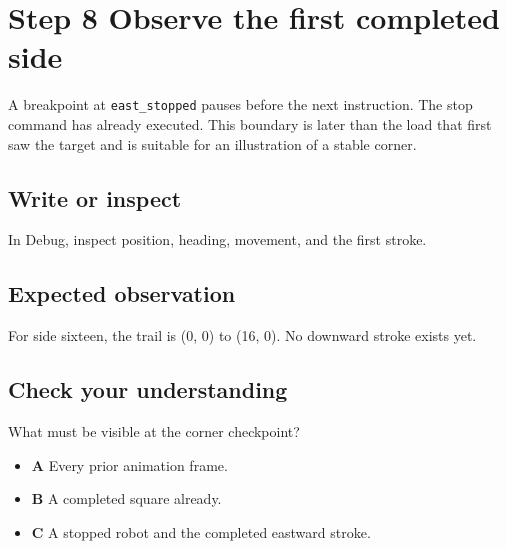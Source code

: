 \section{Step 8 Observe the first completed
  side}\label{006-marsbot-square-s08-step-8-observe-the-first-completed-side}

A breakpoint at \texttt{east\_stopped} pauses before the next
instruction. The stop command has already executed. This boundary is
later than the load that first saw the target and is suitable for an
illustration of a stable corner.

\subsection{Write or
  inspect}\label{006-marsbot-square-s08-write-or-inspect}

In Debug, inspect position, heading, movement, and the first stroke.

\subsection{Expected
  observation}\label{006-marsbot-square-s08-expected-observation}

For side sixteen, the trail is (0, 0) to (16, 0). No downward stroke
exists yet.

\subsection{Check your
  understanding}\label{006-marsbot-square-s08-check-your-understanding}

What must be visible at the corner checkpoint?

\begin{itemize}
  \tightlist
  \item
        \textbf{A} Every prior animation frame.
  \item
        \textbf{B} A completed square already.
  \item
        \textbf{C} A stopped robot and the completed eastward stroke.
\end{itemize}

